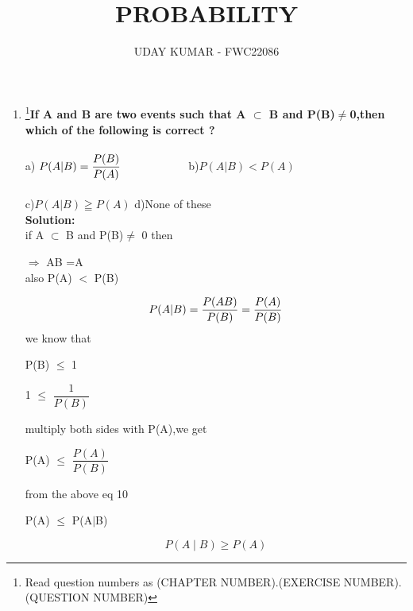 \documentclass{article}
\newcommand{\solution}{\noindent \textbf{Solution: }}
\begin{document}
\title{PROBABILITY}
\author{\Large UDAY KUMAR - FWC22086}
\date{}

\maketitle

\begin{enumerate}[label=13.\arabic{enumi}.\arabic{enumii}]%
\setcounter{enumi}{3}
\setcounter{enumii}{14}

\item \footnote{Read question numbers as (CHAPTER NUMBER).(EXERCISE NUMBER).(QUESTION NUMBER)}\textbf {If A and B are two events such that A $\subset$ B and P(B)$\neq$0,then which of the following is correct ?} 
\hspace{15mm}\\
\\
a) $P(A|B) = \dfrac{P(B)}{P(A)}\hspace{20mm}$ b)$P(A|B) < P(A)$
\\
\\
c)$P(A|B) \geqq P(A)$ \hspace{21mm} d)None of these\\[1ex]
	\solution\\
		if A $\subset$ B and P(B)$\neq$ 0 then \\
\begin{center}
$\Rightarrow$ AB =A\\
also P(A) $<$ P(B)\\\vspace{2mm}
\end{center}
\begin{equation}
P(A|B) = \dfrac{P(A B)}{P(B)}=\dfrac{P(A)}{P(B)}\\
\end{equation}
we know that \\
\begin{center}
P(B) $\leq$ 1
\end{center}
\begin{center}
1 $\leq$ $\dfrac{1}{P(B)}$
\end{center}
multiply both sides with P(A),we get 
\begin{center}
P(A) $\leq$ $\dfrac{P(A)}{P(B)}$
\end{center}
from the above eq 10
\begin{center}
P(A) $\leq$ P(A$\mid$B)
\end{center}
\begin{equation}
\boxed{ P(A \mid B)\geq P(A)}
\end{equation}
		

    

\end{enumerate}
\end{document}
